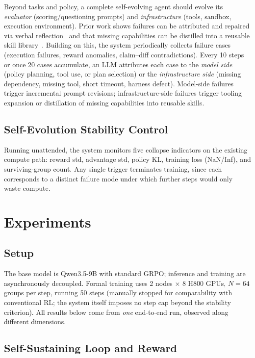 \documentclass[twocolumn,a4paper]{ctexart}
\begin{document}
Beyond tasks and policy, a complete self-evolving agent should evolve its \emph{evaluator} (scoring/questioning prompts) and \emph{infrastructure} (tools, sandbox, execution environment). Prior work shows failures can be attributed and repaired via verbal reflection~\cite{reflexion} and that missing capabilities can be distilled into a reusable skill library~\cite{voyager}. Building on this, the system periodically collects failure cases (execution failures, reward anomalies, claim--diff contradictions). Every 10 steps or once 20 cases accumulate, an LLM attributes each case to the \emph{model side} (policy planning, tool use, or plan selection) or the \emph{infrastructure side} (missing dependency, missing tool, short timeout, harness defect). Model-side failures trigger incremental prompt revisions; infrastructure-side failures trigger tooling expansion or distillation of missing capabilities into reusable skills.

\subsection{Self-Evolution Stability Control}

Running unattended, the system monitors five collapse indicators on the existing compute path: reward std, advantage std, policy KL, training loss (NaN/Inf), and surviving-group count. Any single trigger terminates training, since each corresponds to a distinct failure mode under which further steps would only waste compute.

\section{Experiments}

\subsection{Setup}

The base model is Qwen3.5-9B with standard GRPO; inference and training are asynchronously decoupled. Formal training uses 2 nodes $\times$ 8 H800 GPUs, $N{=}64$ groups per step, running 50 steps (manually stopped for comparability with conventional RL; the system itself imposes no step cap beyond the stability criterion). All results below come from \emph{one} end-to-end run, observed along different dimensions.

\subsection{Self-Sustaining Loop and Reward}
\end{document}
